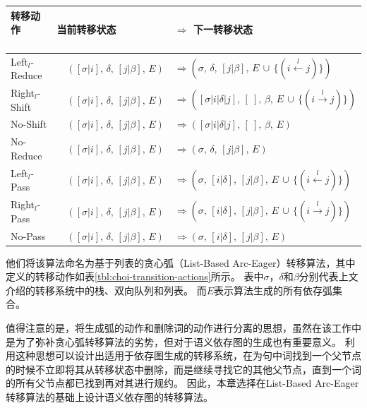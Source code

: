 \begin{table}[htbp]
	\centering
	\begin{tabular}{l|ll}
		\hline
		\bf 转移动作 \ \ \ \ & \bf 当前转移状态 & $\Rightarrow$ \bf 下一转移状态 \\
		\hline\hline
		Left$_l$-Reduce &\ \ $([\sigma|i],\,\delta,\,[j|\beta],\,E)$ & $\Rightarrow (\sigma,\,\delta,\,[j|\beta],\,E\,\cup\,\{(i\xleftarrow{l}j)\})$ \\
		Right$_l$-Shift &\ \ $([\sigma|i],\,\delta,\,[j|\beta],\,E)$ & $\Rightarrow ([\sigma|i|\delta|j],\,[\ ],\,\beta,\,E\,\cup\,\{(i\xrightarrow{l}j)\})$ \\
		No-Shift &\ \ $([\sigma|i],\,\delta,\,[j|\beta],\,E)$ & $\Rightarrow 
		([\sigma|i|\delta|j],\,[\ ],\,\beta,\,E)$ \\
		No-Reduce &\ \ $([\sigma|i],\,\delta,\,[j|\beta],\,E)$ & $\Rightarrow (\sigma,\,\delta,\,[j|\beta],\,E)$\\
		\hline
		Left$_l$-Pass &\ \ $([\sigma|i],\,\delta,\,[j|\beta],\,E)$ & $\Rightarrow (\sigma,\,[i|\delta],\,[j|\beta],\,E\,\cup\,\{(i\xleftarrow{l}j)\})$\\
		Right$_l$-Pass &\ \ $([\sigma|i],\,\delta,\,[j|\beta],\,E)$ & $\Rightarrow (\sigma,\,[i|\delta],\,[j|\beta],\,E\,\cup\,\{(i\xrightarrow{l}j)\})$\\
		No-Pass &\ \ $([\sigma|i],\,\delta,\,[j|\beta],\,E)$ & $\Rightarrow (\sigma,\,[i|\delta]	,\,[j|\beta],\,E)$\\
		\hline
	\end{tabular}
	\label{tbl:actions}
\end{table}

他们将该算法命名为基于列表的贪心弧（List-Based Arc-Eager）转移算法，其中定义的转移动作如表\ref{tbl:choi-transition-actions}所示。
表中$\sigma$，$\delta$和$\beta$分别代表上文介绍的转移系统中的栈、双向队列和列表。
而$E$表示算法生成的所有依存弧集合。

值得注意的是，将生成弧的动作和删除词的动作进行分离的思想，虽然在该工作中是为了弥补贪心弧转移算法的劣势，但对于语义依存图的生成也有重要意义。
利用这种思想可以设计出适用于依存图生成的转移系统，在为句中词找到一个父节点的时候不立即将其从转移状态中删除，而是继续寻找它的其他父节点，直到一个词的所有父节点都已找到再对其进行规约。
因此，本章选择在List-Based Arc-Eager转移算法的基础上设计语义依存图的转移算法。

